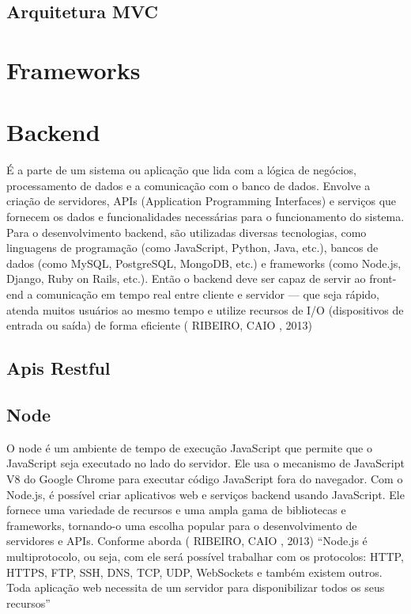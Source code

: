 \subsection{Arquitetura MVC}

\section{Frameworks}

\section{Backend}
É a parte de um sistema ou aplicação que lida com a lógica de negócios, processamento de dados e a comunicação com o banco de dados. Envolve a criação de servidores, APIs (Application Programming Interfaces) e serviços que fornecem os dados e funcionalidades necessárias para o funcionamento do sistema. Para o desenvolvimento backend, são utilizadas diversas tecnologias, como linguagens de programação (como JavaScript, Python, Java, etc.), bancos de dados (como MySQL, PostgreSQL, MongoDB, etc.) e frameworks (como Node.js, Django, Ruby on Rails, etc.). Então o backend deve ser capaz de servir ao front-end a comunicação em tempo real entre cliente e servidor — que seja rápido, atenda muitos usuários ao mesmo tempo e utilize recursos de I/O (dispositivos de entrada ou saída) de forma eficiente ( RIBEIRO, CAIO , 2013)

\subsection{Apis Restful}

\subsection{Node}
O node é um ambiente de tempo de execução JavaScript que permite que o JavaScript seja executado no lado do servidor. Ele usa o mecanismo de JavaScript V8 do Google Chrome para executar código JavaScript fora do navegador. Com o Node.js, é possível criar aplicativos web e serviços backend usando JavaScript. Ele fornece uma variedade de recursos e uma ampla gama de bibliotecas e frameworks, tornando-o uma escolha popular para o desenvolvimento de servidores e APIs. Conforme aborda  ( RIBEIRO, CAIO , 2013) “Node.js é multiprotocolo, ou seja, com ele será possível trabalhar com os protocolos: HTTP, HTTPS, FTP, SSH, DNS, TCP, UDP, WebSockets e também existem outros.  Toda aplicação web necessita de um servidor para disponibilizar todos os seus  recursos”

